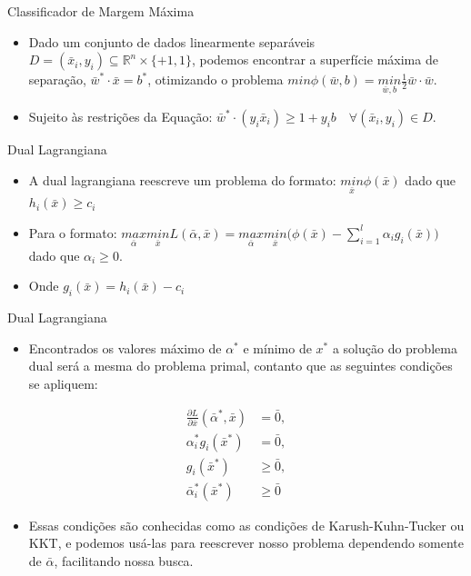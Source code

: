 \documentclass{beamer}
\begin{document}
\begin{frame}{Classificador de Margem Máxima}
\begin{itemize}
    \item Dado um conjunto de dados linearmente separáveis $D=(\bar{x}_i,y_i) \subseteq \mathbb{R}^n\times\{+1,1\}$, podemos encontrar a superfície máxima de separação, $\bar{w}^*\cdot\bar{x}=b^*$, otimizando o problema $min\phi(\bar{w},b) = \underset{\bar{w},b}{min}\frac{1}{2}\bar{w}\cdot\bar{w}$.
    \item Sujeito às restrições da Equação: $\bar{w}^*\cdot(y_i\bar{x}_i) \ge 1+y_i b \quad \forall (\bar{x}_i,y_i)\in D$.
\end{itemize}
\end{frame}

\begin{frame}{Dual Lagrangiana}
\begin{itemize}
    \item A dual lagrangiana reescreve um problema do formato: $\underset{\bar{x}}{min}\phi(\bar{x})$ dado que $h_i(\bar{x})\ge c_i$
    \item Para o formato: $\underset{\bar{\alpha}}{max} \underset{\bar{x}}{min} L(\bar{\alpha},\bar{x}) = \underset{\bar{\alpha}}{max} \underset{\bar{x}}{min}\bigg(\phi(\bar{x})-\sum_{i=1}^{l}\alpha_i g_i(\bar{x})\bigg)$ dado que $\alpha_i\ge0$.
    \item Onde $g_i(\bar{x})=h_i(\bar{x})-c_i$
\end{itemize}
\end{frame}

\begin{frame}{Dual Lagrangiana}
\begin{itemize}
    \item Encontrados os valores máximo de $\alpha^*$ e mínimo de $x^*$ a solução do problema dual será a mesma do problema primal, contanto que as seguintes condições se apliquem:
\end{itemize}
\begin{equation}
\begin{split}
\frac{\partial L}{\partial \bar{x}}(\bar{\alpha}^*,\bar{x})&=\bar{0}, \\
\alpha_i^*g_i(\bar{x}^*)&=\bar{0}, \\
g_i(\bar{x}^*)&\ge\bar{0} , \\
\bar{\alpha}_i^*(\bar{x}^*)&\ge\bar{0} 
\end{split}
\end{equation}
\begin{itemize}
    \item Essas condições são conhecidas como as condições de Karush-Kuhn-Tucker ou KKT, e podemos usá-las para reescrever nosso problema dependendo somente de $\bar{\alpha}$, facilitando nossa busca.
\end{itemize}
\end{frame}
\end{document}
